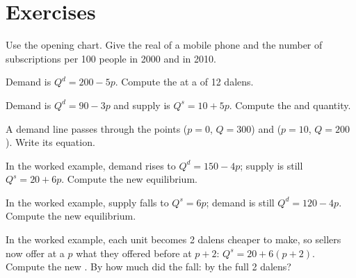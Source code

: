 \section{Exercises}

\begin{exercise}[$\star$]\label{exo:g9:demand-and-supply-equations:1}
Use the opening chart. Give the real  of a mobile phone and the number of subscriptions per 100
people in 2000 and in 2010.
\end{exercise}

\begin{exercise}[$\star$]\label{exo:g9:demand-and-supply-equations:2}
Demand is $Q^d = 200 - 5p$. Compute the  at a  of 12 dalens.
\end{exercise}

\begin{exercise}[$\star$]\label{exo:g9:demand-and-supply-equations:3}
Demand is $Q^d = 90 - 3p$ and supply is $Q^s = 10 + 5p$. Compute the  and quantity.
\end{exercise}

\begin{exercise}[$\star$]\label{exo:g9:demand-and-supply-equations:4}
A demand line passes through the points ($p = 0$, $Q = 300$) and ($p = 10$, $Q = 200$). Write its
equation.
\end{exercise}

\begin{exercise}[$\star\star$]\label{exo:g9:demand-and-supply-equations:5}
In the worked example, demand rises to $Q^d = 150 - 4p$; supply is still $Q^s = 20 + 6p$. Compute the
new equilibrium.
\end{exercise}

\begin{exercise}[$\star\star$]\label{exo:g9:demand-and-supply-equations:6}
In the worked example, supply falls to $Q^s = 6p$; demand is still $Q^d = 120 - 4p$. Compute the new
equilibrium.
\end{exercise}

\begin{exercise}[$\star\star$]\label{exo:g9:demand-and-supply-equations:7}
In the worked example, each unit becomes 2 dalens cheaper to make, so sellers now offer at a  $p$
what they offered before at $p + 2$: $Q^s = 20 + 6(p + 2)$. Compute the new . By how
much did the  fall: by the full 2 dalens?
\end{exercise}

